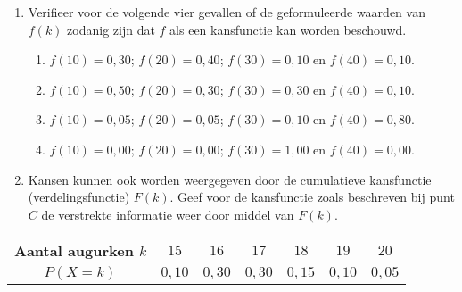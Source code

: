 \begin{enumerate}[label=(\alph*)]
    \item Verifieer voor de volgende vier gevallen of de geformuleerde waarden van $f(k)$ zodanig 
    zijn dat $f$ als een kansfunctie kan worden beschouwd.
    \begin{enumerate}[label=(\Alph*)]
        \item $f(10) = 0,30$; $f(20) = 0,40$; $f(30) = 0,10$ en $f(40) = 0,10$.
        \item $f(10) = 0,50$; $f(20) = 0,30$; $f(30) = 0,30$ en $f(40) = 0,10$.
        \item $f(10) = 0,05$; $f(20) = 0,05$; $f(30) = 0,10$ en $f(40) = 0,80$. 
        \item $f(10) = 0,00$; $f(20) = 0,00$; $f(30) = 1,00$ en $f(40) = 0,00$. 
    \end{enumerate}

    \item Kansen kunnen ook worden weergegeven door de cumulatieve kansfunctie 
    (verdelingsfunctie) $F(k)$. Geef voor de kansfunctie zoals beschreven bij punt $C$ de verstrekte 
    informatie weer door middel van $F(k)$. 
\end{enumerate}

\begin{center}
    \begin{tabular}{ccccccc}
        \toprule
            {\bfseries Aantal augurken $k$} & $15$ & $16$ & $17$ & $18$ & $19$ & $20$\\
        \cmidrule{1-1} \cmidrule{2-2} \cmidrule{3-3} \cmidrule{4-4} \cmidrule{5-5} \cmidrule{6-6} \cmidrule{7-7}
            $P(X = k)$ & $0,10$ & $0,30$ & $0,30$ & $0,15$ & $0,10$ & $0,05$\\
        \bottomrule
    \end{tabular}
\end{center}

